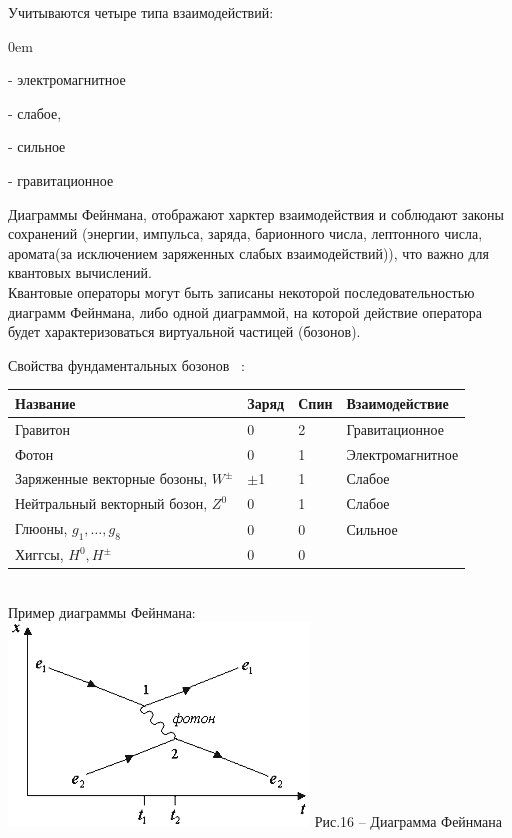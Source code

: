 \documentclass[11pt]{report}
\begin{document}
Учитываются четыре типа взаимодействий:\\
\begin{description}
\addtolength{\itemindent}{0.80cm}
\itemsep0em
\item[] - электромагнитное
\item[] - слабое,
\item[] - сильное 
\item[] - гравитационное
\end{description}


Диаграммы Фейнмана, отображают харктер взаимодействия и соблюдают законы сохранений (энергии, импульса, заряда, барионного числа, лептонного числа, аромата(за исключением заряженных слабых взаимодействий)), что важно для квантовых вычислений. \\

Квантовые операторы могут быть записаны некоторой последовательностью диаграмм Фейнмана, либо одной диаграммой, на которой действие оператора будет характеризоваться виртуальной частицей (бозонов).

Свойства фундаментальных бозонов ~\cite{saricheva}:\\
\begin{tabular}{|p{6cm}|p{2cm}|p{2cm}|p{4cm}|}
\hline
	Название  & Заряд & Спин & Взаимодействие \\
\hline	
	Гравитон  & 0 & 2 & Гравитационное \\
\hline
	Фотон     & 0 & 1 & Электромагнитное \\
\hline
	Заряженные векторные бозоны, $W^{\pm}$     & $\pm$1 & 1 & Слабое \\	
\hline
	Нейтральный векторный бозон, $Z^0$     & 0 & 1 & Слабое \\		
\hline
	Глюоны, $g_1,\dots,g_8$     & 0 & 0 & Сильное \\			
\hline
	Хиггсы, $H^0,H^{\pm}$     & 0 & 0 &  \\				
\hline	
\end{tabular}\\

Пример диаграммы Фейнмана: \\
\includegraphics[scale=1]{feinman}
Рис.16 -- Диаграмма Фейнмана \\
\end{document}
